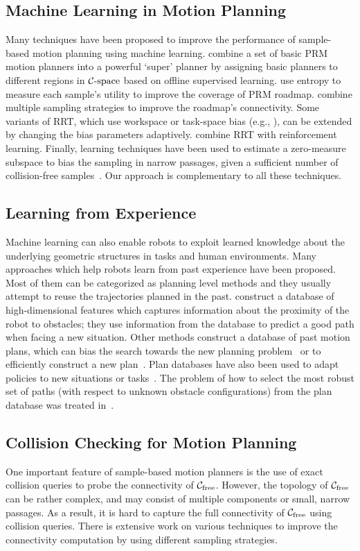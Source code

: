 \subsection{Machine Learning in Motion Planning}
Many techniques have been proposed to improve the performance of sample-based motion planning using machine learning. \cite{Marco:2004:WAFR} combine a set of basic PRM motion planners into a powerful `super' planner by assigning basic planners to different regions in $\mathcal C\text{-space}$ based on offline supervised learning. \cite{Burns:2003:ITC,Burns:2005:SQE,Burns-RSS-05} use entropy to measure each sample's utility to improve the coverage of PRM roadmap. \cite{Hsu:2005} combine multiple sampling strategies to improve the roadmap's connectivity. Some variants of RRT, which use workspace or task-space bias (e.g., \cite{Diankov:2008}), can be extended by changing the bias parameters adaptively.
\cite{Scholz:2010} combine RRT with reinforcement learning. Finally, learning techniques have been used to estimate a zero-measure subspace to bias the sampling in narrow passages, given a sufficient number of collision-free samples~\cite{Dalibard:2011}. Our approach is complementary to all these techniques.

\subsection{Learning from Experience}
Machine learning can also enable robots to exploit learned knowledge about the underlying geometric structures in tasks and human environments. Many approaches which help robots learn from past experience have been proposed. Most of them can be categorized as planning level methods and they usually attempt to reuse the trajectories planned in the past. \cite{Jetchev:2010} construct a database of high-dimensional features which captures information about the proximity of the robot to obstacles; they use information from the database to predict a good path when facing a new situation.
Other methods construct a database of past motion plans, which can bias the search towards the new planning problem~\cite{Jiang:2007} or to efficiently construct a new plan~\cite{Berenson:2012, Mike:2012}. Plan databases have also been used to adapt policies to new situations or tasks~\cite{Stolle:2006}. The problem of how to select the
most robust set of paths (with respect to unknown obstacle configurations) from the plan database was treated in~\cite{Branicky:2008}.

\subsection{Collision Checking for Motion Planning}
One important feature of sample-based motion planners is the use of exact collision queries to probe the connectivity of $\mathcal C_{\text{free}}$. However, the topology of $\mathcal C_{\text{free}}$ can be rather complex, and may consist of multiple components or small, narrow passages. As a result, it is hard to capture the full connectivity of $\mathcal C_{\text{free}}$ using collision queries. There is extensive work on various techniques to improve the connectivity computation by using different sampling strategies.

